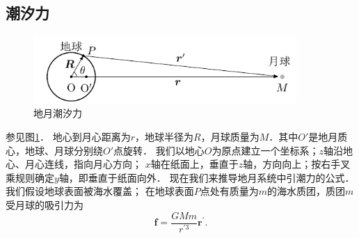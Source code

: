 \subsection{潮汐力}


\begin{figure}[htb]
    \centering
    \includegraphics[width=10cm]{fig/II1-Earth.pdf}
    \caption{地月潮汐力} \label{chsr:fig_tidal-force}
\end{figure}



参见图\ref{chsr:fig_tidal-force}．
地心到月心距离为$r$，地球半径为$R$，月球质量为$M$．其中$O'$是地月质心，地球、月球分别绕$O'$点旋转．
我们以地心$O$为原点建立一个坐标系；$z$轴沿地心、月心连线，指向月心方向；
$x$轴在纸面上，垂直于$z$轴，方向向上；按右手叉乘规则确定$y$轴，即垂直于纸面向外．
现在我们来推导地月系统中引潮力的公式．
我们假设地球表面被海水覆盖；
在地球表面$P$点处有质量为$m$的海水质团，质团$m$受月球的吸引力为
\begin{equation}
    \boldsymbol{f} =\frac{GMm}{r^{\prime 3}} \boldsymbol{r}^{\prime} .
\end{equation}

